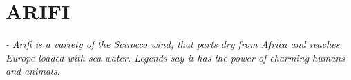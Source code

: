 \section*{ARIFI}
\textit{- Arifi is a variety of the Scirocco wind, that parts dry from Africa and reaches Europe loaded with sea water. Legends say it has the power of charming humans and animals.}\\